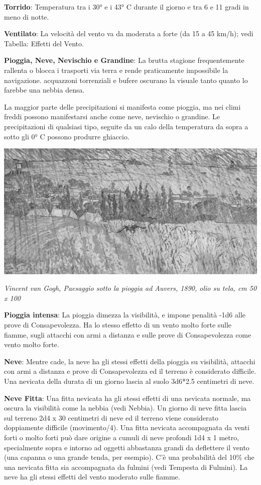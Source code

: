 \begin{multicols}{2}
\textbf{Torrido}: Temperatura tra i 30° e i 43° C durante il giorno e tra 6 e 11 gradi in meno di notte.

\textbf{Ventilato}: La velocità del vento va da moderata a forte (da 15 a 45 km/h); vedi Tabella: Effetti del Vento.

\textbf{Pioggia, Neve, Nevischio e Grandine}: La brutta stagione frequentemente rallenta o blocca i trasporti via terra e rende praticamente impossibile la navigazione. acquazzoni torrenziali e bufere oscurano la visuale tanto quanto lo farebbe una nebbia densa.

La maggior parte delle precipitazioni si manifesta come pioggia, ma nei climi freddi possono manifestarsi anche come neve, nevischio o grandine. Le precipitazioni di qualsiasi tipo, seguite da un calo della temperatura da sopra a sotto gli 0° C possono produrre ghiaccio.

\begin{center}

	\includegraphics[width=0.95\linewidth]{immagini/Paesaggio-pioggia-Auvers.png}

	\emph{Vincent van Gogh, Paesaggio sotto la pioggia ad Auvers, 1890, olio su tela, cm 50 x 100}
\end{center}


\textbf{Pioggia intensa}: La pioggia dimezza la visibilità, e impone penalità -1d6 alle prove di Consapevolezza. Ha lo stesso effetto di un vento molto forte sulle fiamme, sugli attacchi con armi a distanza e sulle prove di Consapevolezza come vento molto forte.

\textbf{Neve}: Mentre cade, la neve ha gli stessi effetti della pioggia su visibilità, attacchi con armi a distanza e prove di Consapevolezza ed il terreno è considerato difficile. Una nevicata della durata di un giorno lascia al suolo 3d6*2.5 centimetri di neve.

\textbf{Neve Fitta}: Una fitta nevicata ha gli stessi effetti di una nevicata normale, ma oscura la visibilità come la nebbia (vedi Nebbia). Un giorno di neve fitta lascia sul terreno 2d4 x 30 centimetri di neve ed il terreno viene considerato doppiamente difficile (movimento/4). Una fitta nevicata accompagnata da venti forti o molto forti può dare origine a cumuli di neve profondi 1d4 x 1 metro, specialmente sopra e intorno ad oggetti abbastanza grandi da deflettere il vento (una capanna o una grande tenda, per esempio).
C'è una probabilità del 10\% che una nevicata fitta sia accompagnata da fulmini (vedi Tempesta di Fulmini). La neve ha gli stessi effetti del vento moderato sulle fiamme.


\end{multicols}
